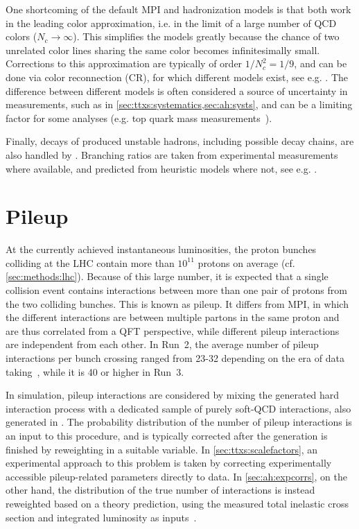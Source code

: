 One shortcoming of the default MPI and hadronization models is that both work in the leading color approximation, i.e. in the limit of a large number of QCD colors ($N_c \rightarrow \infty$). This simplifies the models greatly because the chance of two unrelated color lines sharing the same color becomes infinitesimally small. Corrections to this approximation are typically of order $1/N_c^2 = 1/9$, and can be done via color reconnection (CR), for which different models exist, see e.g. . The difference between different models is often considered a source of uncertainty in measurements, such as in \cref{sec:ttxs:systematics,sec:ah:systs}, and can be a limiting factor for some analyses (e.g. top quark mass measurements~\cite{CMS:TOP-20-008,ATLAS:2025bpp}).

Finally, decays of produced unstable hadrons, including possible decay chains, are also handled by \pythia. Branching ratios are taken from experimental measurements where available, and predicted from heuristic models where not, see e.g. .

\section{Pileup}
\label{sec:mc:pileup}

At the currently achieved instantaneous luminosities, the proton bunches colliding at the LHC contain more than $10^{11}$ protons on average (cf. \cref{sec:methods:lhc}). Because of this large number, it is expected that a single collision event contains interactions between more than one pair of protons from the two colliding bunches. This is known as pileup. It differs from MPI, in which the different interactions are between multiple partons in the same proton and are thus correlated from a QFT perspective, while different pileup interactions are independent from each other. In Run~2, the average number of pileup interactions per bunch crossing ranged from 23-32 depending on the era of data taking~\cite{CMS:2020ebo}, while it is 40 or higher in Run~3.

In simulation, pileup interactions are considered by mixing the generated hard interaction process with a dedicated sample of purely soft-QCD interactions, also generated in \pythia. The probability distribution of the number of pileup interactions is an input to this procedure, and is typically corrected after the generation is finished by reweighting in a suitable variable. In \cref{sec:ttxs:scalefactors}, an experimental approach to this problem is taken by correcting experimentally accessible pileup-related parameters directly to data. In \cref{sec:ah:expcorrs}, on the other hand, the distribution of the true number of interactions is instead reweighted based on a theory prediction, using the measured total inelastic cross section and integrated luminosity as inputs~\cite{CMS:LUM-17-003}.

